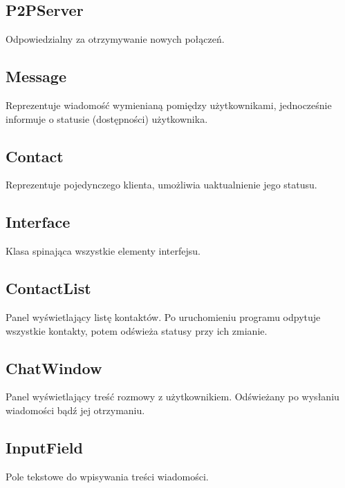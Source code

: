 \documentclass[11pt,a4paper]{article}
\begin{document}
\subsection{P2PServer}
Odpowiedzialny za otrzymywanie nowych połączeń.

\subsection{Message}
Reprezentuje wiadomość wymienianą pomiędzy użytkownikami, jednocześnie informuje o statusie (dostępności) użytkownika.

\subsection{Contact}
Reprezentuje pojedynczego klienta, umożliwia uaktualnienie jego statusu.

\subsection{Interface}
Klasa spinająca wszystkie elementy interfejsu.

\subsection{ContactList}
Panel wyświetlający listę kontaktów. Po uruchomieniu programu odpytuje wszystkie kontakty, potem odświeża statusy przy ich zmianie. 

\subsection{ChatWindow}
Panel wyświetlający treść rozmowy z użytkownikiem. Odświeżany po wysłaniu wiadomości bądź jej otrzymaniu. 

\subsection{InputField}
Pole tekstowe do wpisywania treści wiadomości.
\end{document}
